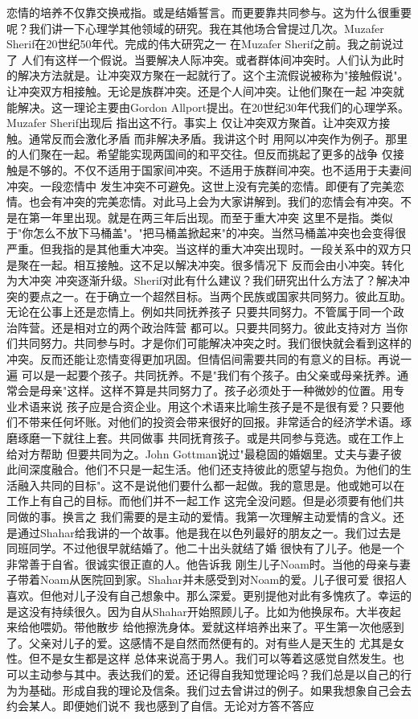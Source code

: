 恋情的培养不仅靠交换戒指。或是结婚誓言。而更要靠共同参与。这为什么很重要呢？我们讲一下心理学其他领域的研究。我在其他场合曾提过几次。Muzafer Sherif在20世纪50年代。完成的伟大研究之一 在Muzafer Sherif之前。我之前说过了 人们有这样一个假说。当要解决人际冲突。或者群体间冲突时。人们认为此时的解决方法就是。让冲突双方聚在一起就行了。这个主流假说被称为"接触假说"。让冲突双方相接触。无论是族群冲突。还是个人间冲突。让他们聚在一起 冲突就能解决。这一理论主要由Gordon Allport提出。在20世纪30年代我们的心理学系。Muzafer Sherif出现后 指出这不行。事实上 仅让冲突双方聚首。让冲突双方接触。通常反而会激化矛盾 而非解决矛盾。我讲这个时 用阿以冲突作为例子。那里的人们聚在一起。希望能实现两国间的和平交往。但反而挑起了更多的战争 仅接触是不够的。不仅不适用于国家间冲突。不适用于族群间冲突。也不适用于夫妻间冲突。一段恋情中 发生冲突不可避免。这世上没有完美的恋情。即便有了完美恋情。也会有冲突的完美恋情。对此马上会为大家讲解到。我们的恋情会有冲突。不是在第一年里出现。就是在两三年后出现。而至于重大冲突 这里不是指。类似于"你怎么不放下马桶盖"。"把马桶盖掀起来"的冲突。当然马桶盖冲突也会变得很严重。但我指的是其他重大冲突。当这样的重大冲突出现时。一段关系中的双方只是聚在一起。相互接触。这不足以解决冲突。很多情况下 反而会由小冲突。转化为大冲突 冲突逐渐升级。Sherif对此有什么建议？我们研究出什么方法了？解决冲突的要点之一。在于确立一个超然目标。当两个民族或国家共同努力。彼此互助。无论在公事上还是恋情上。例如共同抚养孩子 只要共同努力。不管属于同一个政治阵营。还是相对立的两个政治阵营 都可以。只要共同努力。彼此支持对方 当你们共同努力。共同参与时。才是你们可能解决冲突之时。我们很快就会看到这样的冲突。反而还能让恋情变得更加巩固。但情侣间需要共同的有意义的目标。再说一遍 可以是一起要个孩子。共同抚养。不是"我们有个孩子。由父亲或母亲抚养。通常会是母亲"这样。这样不算是共同努力了。孩子必须处于一种微妙的位置。用专业术语来说 孩子应是合资企业。用这个术语来比喻生孩子是不是很有爱？只要他们不带来任何坏账。对他们的投资会带来很好的回报。非常适合的经济学术语。琢磨琢磨一下就往上套。共同做事 共同抚育孩子。或是共同参与竞选。或在工作上给对方帮助 但要共同为之。John Gottman说过"最稳固的婚姻里。丈夫与妻子彼此间深度融合。他们不只是一起生活。他们还支持彼此的愿望与抱负。为他们的生活融入共同的目标"。这不是说他们要什么都一起做。我的意思是。他或她可以在工作上有自己的目标。而他们并不一起工作 这完全没问题。但是必须要有他们共同做的事。换言之 我们需要的是主动的爱情。我第一次理解主动爱情的含义。还是通过Shahar给我讲的一个故事。他是我在以色列最好的朋友之一。我们过去是同班同学。不过他很早就结婚了。他二十出头就结了婚 很快有了儿子。他是一个非常善于自省。很诚实很正直的人。他告诉我 刚生儿子Noam时。当他的母亲与妻子带着Noam从医院回到家。Shahar并未感受到对Noam的爱。儿子很可爱 很招人喜欢。但他对儿子没有自己想象中。那么深爱。更别提他对此有多愧疚了。幸运的是这没有持续很久。因为自从Shahar开始照顾儿子。比如为他换尿布。大半夜起来给他喂奶。带他散步 给他擦洗身体。爱就这样培养出来了。平生第一次他感到了。父亲对儿子的爱。这感情不是自然而然便有的。对有些人是天生的 尤其是女性。但不是女生都是这样 总体来说高于男人。我们可以等着这感觉自然发生。也可以主动参与其中。表达我们的爱。还记得自我知觉理论吗？我们总是以自己的行为为基础。形成自我的理论及信条。我们过去曾讲过的例子。如果我想象自己会去约会某人。即便她们说不 我也感到了自信。无论对方答不答应 